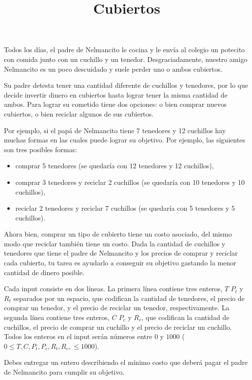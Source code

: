 \documentclass{oci}
\title{Cubiertos}
\begin{document}
\begin{problemDescription}
Todos los días, el padre de Nelmancito le cocina y le envía al colegio un potecito con comida junto con un cuchillo y un tenedor. Desgraciadamente, nuestro amigo Nelmancito es un poco descuidado y suele perder uno o ambos cubiertos.

Su padre detesta tener una cantidad diferente de cuchillos y tenedores, por lo que decide invertir dinero en cubiertos hasta lograr tener la misma cantidad de ambos. Para lograr su cometido tiene dos opciones: o bien comprar nuevos cubiertos, o bien reciclar algunos de sus cubiertos.

Por ejemplo, si el papá de Nelmancito tiene 7 tenedores y 12 cuchillos hay muchas formas en las cuales puede lograr su objetivo. Por ejemplo, las siguientes son tres posibles formas: 
\begin{itemize}
	\item comprar 5 tenedores (se quedaría con 12 tenedores y 12 cuchillos),
	\item comprar 3 tenedores y reciclar 2 cuchillos (se quedaría con 10 tenedores y 10 cuchillos),
	\item reciclar 2 tenedores y reciclar 7 cuchillos (se quedaría con 5 tenedores y 5 cuchillos).
\end{itemize}

Ahora bien, comprar un tipo de cubierto tiene un costo asociado, del mismo modo que reciclar también tiene un costo. 
Dada la cantidad de cuchillos y tenedores que tiene el padre de Nelmancito y los precios de comprar y reciclar cada cubierto, tu tarea
es ayudarlo a conseguir su objetivo gastando la menor cantidad de dinero posible.


\end{problemDescription}

\begin{inputDescription}
Cada input consiste en dos líneas. La primera línea contiene tres enteros, $T$ $P_t$ y $R_t$ separados por un espacio, que codifican la cantidad de tenedores, el precio de comprar un tenedor, y el precio de reciclar un tenedor, respectivamente. La segunda línea contiene tres enteros, $C$ $P_c$ y $R_c$, que codifican la cantidad de cuchillos, el precio de comprar un cuchillo y el precio de reciclar un cuchillo.
Todos los enteros en el input serán números entre $0$ y $1000$ ($0\leq T,C,P_t,P_c,R_t,R_c, \leq 1000$).
\end{inputDescription}

\begin{outputDescription}
Debes entregar un entero describiendo el mínimo costo que deberá pagar el padre de Nelmancito para cumplir su objetivo.
\end{outputDescription}
\end{document}
